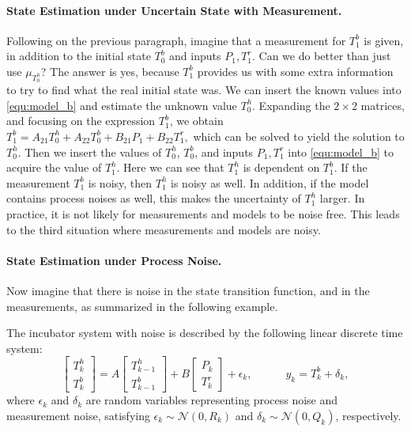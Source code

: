 \paragraph{State Estimation under Uncertain State with Measurement.}
Following on the previous paragraph, imagine that a measurement for $T^{b}_1$ is given, in addition to the initial state $T^{b}_0$ and inputs $P_1, T^r_1$. Can we do better than just use $\mu_{T^{h}_0}$?
The answer is yes, because $T^{b}_1$ provides us with some extra information to try to find what the real initial state was.
We can insert the known values into \cref{equ:model_b} and estimate the unknown value $T^{h}_0$.
Expanding the $2 \times 2$ matrices, and focusing on the expression $T^{b}_1$, we obtain
$
T^{b}_1 = A_{21} T^{h}_0 + A_{22} T^{b}_0 + B_{21} P_1 + B_{22} T^r_1,
$
which can be solved to yield the solution to $T^{h}_0$. Then we insert the values of $T^{h}_0$, $T^{b}_0$, and inputs $P_1, T^r_1$ into \cref{equ:model_b} to acquire the value of $T^{h}_1$. 
Here we can see that $T^{h}_1$ is dependent on $T^{b}_1$. 
If the measurement $T^{b}_1$ is noisy, then $T^{h}_1$ is noisy as well. 
In addition, if the model contains process noises as well, this makes the uncertainty of $T^{h}_1$ larger. 
In practice, it is not likely for measurements and models to be noise free.
This leads to the third situation where measurements and models are noisy. 


\paragraph{State Estimation under Process Noise.}
Now imagine that there is noise in the state transition function, and in the measurements, as summarized in the following example.

\begin{example}\label{ex:incubator_noise}
  The incubator system with noise is described by the following linear discrete time system:
  \begin{equation} \label{equ:model_b_noisy}
     	\begin{bmatrix}
     		T^{h}_k\\
     		T^{b}_k
     	\end{bmatrix}
     	=
     	A
     	\begin{bmatrix}
     		T^{h}_{k-1}\\
     		T^{b}_{k-1}
     	\end{bmatrix}
     	+ B
     	\begin{bmatrix}
     		P_k\\
     		T^r_k
     	\end{bmatrix} 
      + \epsilon_k, \hspace{3em}
    y_k = T^{b}_k + \delta_k,
  \end{equation}
  where $\epsilon_k$ and $\delta_k$ are random variables representing process noise and measurement noise, satisfying $\epsilon_k \sim \mathcal{N}(0,R_k)$ and $\delta_k \sim \mathcal{N}(0,Q_k)$, respectively.
\end{example}


